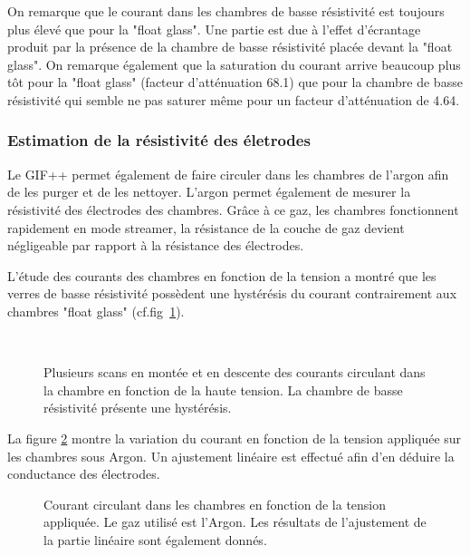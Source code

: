 On remarque que le courant dans les chambres de basse résistivité est toujours plus élevé que pour la "float glass". Une partie est due à l'effet d'écrantage produit par la présence de la chambre de basse résistivité placée devant la "float glass". On remarque également que la saturation du courant arrive beaucoup plus tôt pour la "float glass" (facteur d'atténuation 68.1) que pour la chambre de basse résistivité qui semble ne pas saturer même pour un facteur d'atténuation de \num{4.64}.

\subsubsection{Estimation de la résistivité des életrodes}

Le GIF++ permet également de faire circuler dans les chambres de l'argon afin de les purger et de les nettoyer. L'argon permet également de mesurer la résistivité des électrodes des chambres. Grâce à ce gaz, les chambres fonctionnent rapidement en mode streamer, la résistance de la couche de gaz devient négligeable  par rapport à la résistance des électrodes. 

L'étude des courants des chambres en fonction de la tension a montré que les verres de basse résistivité possèdent une hystérésis du courant contrairement aux chambres "float glass" (cf.fig~\ref{hysteresis}).


\begin{figure}[ht!]
	\centering
	\\
	\caption{Plusieurs scans en montée et en descente  des courants circulant dans la chambre en fonction de la haute tension. La chambre de basse résistivité présente une hystérésis.}
	\label{hysteresis}
\end{figure}


La figure \ref{ScanArgon} montre la variation du courant en fonction de la tension appliquée sur les chambres sous Argon. Un ajustement linéaire est effectué afin d'en déduire la conductance des électrodes.

\begin{figure}[!ht]
	\centering
	\caption{Courant circulant dans les chambres en fonction de la tension appliquée. Le gaz utilisé est l'Argon. Les résultats de l'ajustement de la partie linéaire sont également donnés.}
	\label{ScanArgon}
\end{figure}

